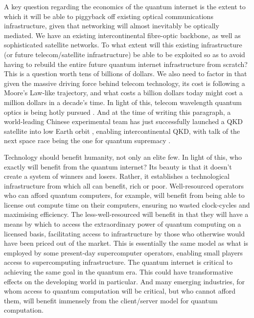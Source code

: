 \documentclass[aps,rmp,twocolumn,amsmath,amssymb,nofootinbib,superscriptaddress,longbibliography,floatfix]{revtex4-1}
\begin{document}
A key question regarding the economics of the quantum internet is the extent to which it will be able to piggyback off existing optical communications infrastructure, given that networking will almost inevitably be optically mediated. We have an existing intercontinental fibre-optic backbone, as well as sophisticated satellite networks. To what extent will this existing infrastructure (or future telecom/satellite infrastructure) be able to be exploited so as to avoid having to rebuild the entire future quantum internet infrastructure from scratch? This is a question worth tens of billions of dollars. We also need to factor in that given the massive driving force behind telecom technology, its cost is following a Moore's Law-like trajectory, and what costs a billion dollars today might cost a million dollars in a decade's time. In light of this, telecom wavelength quantum optics is being hotly pursued \cite{???}. And at the time of writing this paragraph, a world-leading Chinese experimental team has just successfully launched a QKD satellite into low Earth orbit \cite{???}, enabling intercontinental QKD, with talk of the next space race being the one for quantum supremacy \cite{???}.

Technology should benefit humanity, not only an elite few. In light of this, who exactly will benefit from the quantum internet? Its beauty is that it doesn't create a system of winners and losers. Rather, it establishes a technological infrastructure from which all can benefit, rich or poor. Well-resourced operators who can afford quantum computers, for example, will benefit from being able to license out compute time on their computers, ensuring no wasted clock-cycles and maximising efficiency. The less-well-resourced will benefit in that they will have a means by which to access the extraordinary power of quantum computing on a licensed basis, facilitating access to infrastructure by those who otherwise would have been priced out of the market. This is essentially the same model as what is employed by some present-day supercomputer operators, enabling small players access to supercomputing infrastructure. The quantum internet is critical to achieving the same goal in the quantum era. This could have transformative effects on the developing world in particular. And many emerging industries, for whom access to quantum computation will be critical, but who cannot afford them, will benefit immensely from the client/server model for quantum computation.
\end{document}

